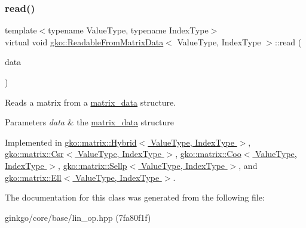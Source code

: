 \subsubsection{\texorpdfstring{read()}{read()}}
{\footnotesize\ttfamily template$<$typename Value\+Type, typename Index\+Type$>$ \\
virtual void \hyperlink{classgko_1_1ReadableFromMatrixData}{gko\+::\+Readable\+From\+Matrix\+Data}$<$ Value\+Type, Index\+Type $>$\+::read (\begin{DoxyParamCaption}\item[{const \hyperlink{structgko_1_1matrix__data}{matrix\+\_\+data}$<$ Value\+Type, Index\+Type $>$ \&}]{data }\end{DoxyParamCaption})\hspace{0.3cm}{\ttfamily [pure virtual]}}



Reads a matrix from a \hyperlink{structgko_1_1matrix__data}{matrix\+\_\+data} structure. 


\begin{DoxyParams}{Parameters}
{\em data} & the \hyperlink{structgko_1_1matrix__data}{matrix\+\_\+data} structure \\
\hline
\end{DoxyParams}


Implemented in \hyperlink{classgko_1_1matrix_1_1Hybrid_a7eff2922ae21e9722b343ca1832d8bf5}{gko\+::matrix\+::\+Hybrid$<$ Value\+Type, Index\+Type $>$}, \hyperlink{classgko_1_1matrix_1_1Csr_ac4db41146ed3c3a8653b03d6b2c6c675}{gko\+::matrix\+::\+Csr$<$ Value\+Type, Index\+Type $>$}, \hyperlink{classgko_1_1matrix_1_1Coo_ac0d4aeb19d9f55b62bea18bad1a408f5}{gko\+::matrix\+::\+Coo$<$ Value\+Type, Index\+Type $>$}, \hyperlink{classgko_1_1matrix_1_1Sellp_a2c5ff4a3f190daf7d70bbd8451d13edd}{gko\+::matrix\+::\+Sellp$<$ Value\+Type, Index\+Type $>$}, and \hyperlink{classgko_1_1matrix_1_1Ell_a2c877d9f7bbc57f97df5ab443954a6fd}{gko\+::matrix\+::\+Ell$<$ Value\+Type, Index\+Type $>$}.



The documentation for this class was generated from the following file\+:\begin{DoxyCompactItemize}
\item 
ginkgo/core/base/lin\+\_\+op.\+hpp (7fa80f1f)\end{DoxyCompactItemize}
